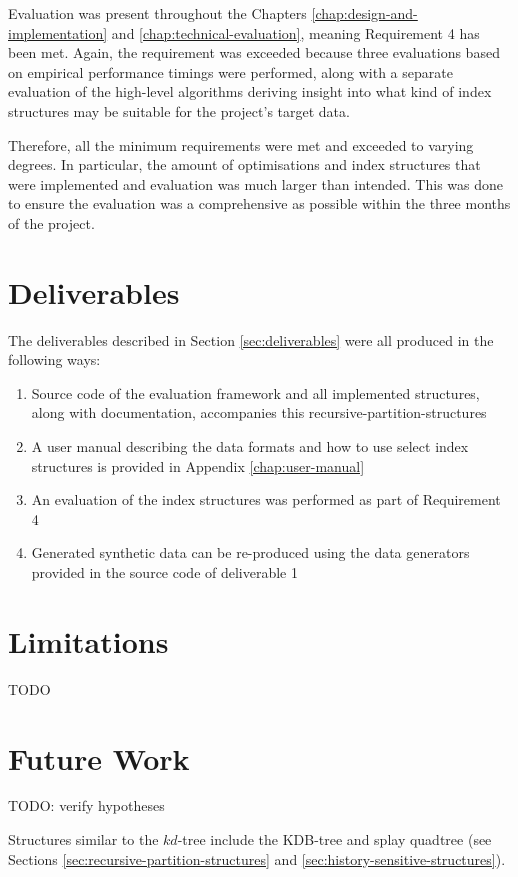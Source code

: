 Evaluation was present throughout the Chapters \ref{chap:design-and-implementation} and \ref{chap:technical-evaluation}, meaning Requirement 4 has been met. Again, the requirement was exceeded because three evaluations based on empirical performance timings were performed, along with a separate evaluation of the high-level algorithms deriving insight into what kind of index structures may be suitable for the project's target data.

Therefore, all the minimum requirements were met and exceeded to varying degrees. In particular, the amount of optimisations and index structures that were implemented and evaluation was much larger than intended. This was done to ensure the evaluation was a comprehensive as possible within the three months of the project.

\section{Deliverables}

The deliverables described in Section \ref{sec:deliverables} were all produced in the following ways:
\begin{enumerate}
	\item Source code of the evaluation framework and all implemented structures, along with documentation, accompanies this recursive-partition-structures
	\item A user manual describing the data formats and how to use select index structures is provided in Appendix \ref{chap:user-manual}
	\item An evaluation of the index structures was performed as part of Requirement 4
	\item Generated synthetic data can be re-produced using the data generators provided in the source code of deliverable 1
\end{enumerate}

\section{Limitations}

TODO

\section{Future Work}

TODO: verify hypotheses

 Structures similar to the $kd$-tree include the KDB-tree and splay quadtree (see Sections \ref{sec:recursive-partition-structures} and \ref{sec:history-sensitive-structures}).

